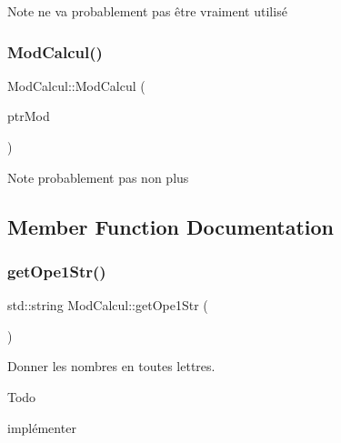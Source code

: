 \begin{DoxyNote}{Note}
ne va probablement pas être vraiment utilisé 
\end{DoxyNote}
\mbox{\label{class_mod_calcul_ad10f52bb861bf4b76e12f5bba1d97b67}} 
\subsubsection{\texorpdfstring{Mod\+Calcul()}{ModCalcul()}\hspace{0.1cm}{\footnotesize\ttfamily [2/2]}}
{\footnotesize\ttfamily Mod\+Calcul\+::\+Mod\+Calcul (\begin{DoxyParamCaption}\item[{\hyperlink{class_mod_calcul}{Mod\+Calcul} $\ast$}]{ptr\+Mod }\end{DoxyParamCaption})}

\begin{DoxyNote}{Note}
probablement pas non plus 
\end{DoxyNote}


\subsection{Member Function Documentation}
\mbox{\label{class_mod_calcul_aa16185334bb48c8e312bd0b9148aa00d}} 
\subsubsection{\texorpdfstring{get\+Ope1\+Str()}{getOpe1Str()}}
{\footnotesize\ttfamily std\+::string Mod\+Calcul\+::get\+Ope1\+Str (\begin{DoxyParamCaption}\item[{void}]{ }\end{DoxyParamCaption})}



Donner les nombres en toutes lettres. 

\begin{DoxyRefDesc}{Todo}
\item[\hyperlink{todo__todo000009}{Todo}]implémenter \end{DoxyRefDesc}
\mbox{\label{class_mod_calcul_ab725cb964df070cf7ccda5853ea918f2}} 
